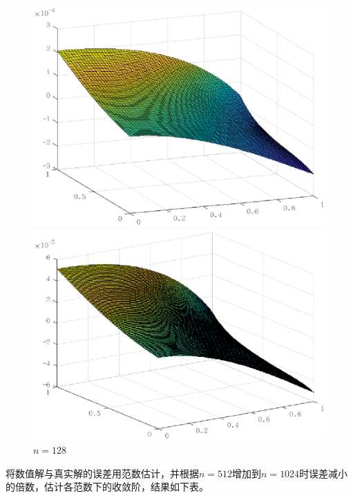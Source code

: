 \documentclass[lang=cn,10pt]{elegantbook}
\begin{document}
\begin{figure}[H]
\begin{minipage}[t]{0.24\linewidth}
    \includegraphics[width=0.95\linewidth]{figure/2-2-3.eps}
    \caption*{$n=64$}
  \end{minipage}
  \begin{minipage}[t]{0.24\linewidth}
    \centering
    \includegraphics[width=0.95\linewidth]{figure/2-2-4.eps}
    \caption*{$n=128$}
  \end{minipage}
\end{figure}

将数值解与真实解的误差用范数估计，并根据$n=512$增加到$n=1024$时误差减小的倍数，估计各范数下的收敛阶，结果如下表。
\end{document}
